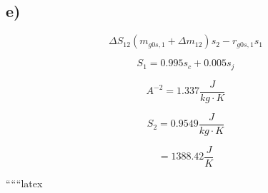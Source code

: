 

\subsection*{e)}

\begin{equation*}
\Delta S_{12} \left( m_{g0s,1} + \Delta m_{12} \right) s_2 - r_{g0s,1} s_1
\end{equation*}

\begin{equation*}
S_1 = 0.995 s_c + 0.005 s_j
\end{equation*}

\begin{equation*}
A^{-2} = 1.337 \frac{J}{kg \cdot K}
\end{equation*}

\begin{equation*}
S_2 = 0.9549 \frac{J}{kg \cdot K}
\end{equation*}

\begin{equation*}
= 1388.42 \frac{J}{K}
\end{equation*}

``````latex